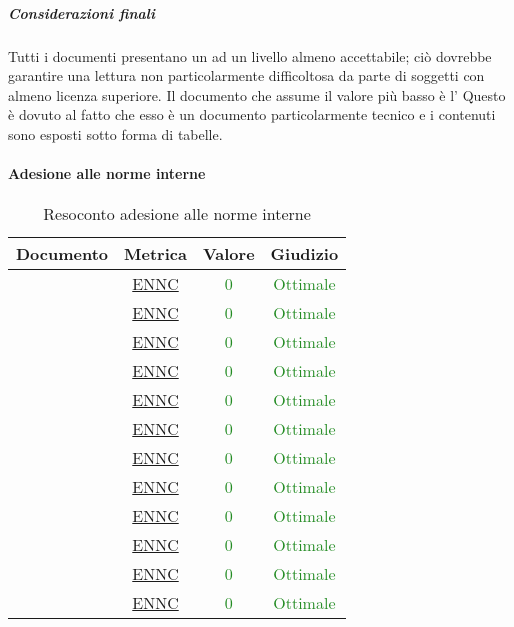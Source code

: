 					\subparagraph{Considerazioni finali}
					Tutti i documenti presentano un  ad un livello almeno accettabile; ciò dovrebbe garantire una lettura non particolarmente difficoltosa da parte di soggetti con almeno licenza superiore.
					Il documento che assume il valore più basso è l'\adrvuno{}
					 Questo è dovuto al fatto che esso è un documento particolarmente tecnico e i contenuti sono esposti sotto forma di tabelle.	
					
					\paragraph{Adesione alle norme interne}
						\begin{table}[H]
							\centering
							\small
							\begin{tabular}{c | c | c | c}
								\hline
								\textbf{Documento} & \textbf{Metrica} & \textbf{Valore} & \textbf{Giudizio} \\
								\hline
								\pdpvuno & \hyperref[MAANI]{ENNC} & \textcolor{ForestGreen}{0} & \textcolor{ForestGreen}{Ottimale} \\
								\pdqvuno & \hyperref[MAANI]{ENNC} & \textcolor{ForestGreen}{0} & \textcolor{ForestGreen}{Ottimale}\\
								\ndpvuno & \hyperref[MAANI]{ENNC} &\textcolor{ForestGreen}{0} & \textcolor{ForestGreen}{Ottimale}\\
								\sdfv & \hyperref[MAANI]{ENNC} & \textcolor{ForestGreen}{0} & \textcolor{ForestGreen}{Ottimale}\\
								\adrvuno & \hyperref[MAANI]{ENNC} & \textcolor{ForestGreen}{0} & \textcolor{ForestGreen}{Ottimale}\\
								\glvuno  & \hyperref[MAANI]{ENNC} & \textcolor{ForestGreen}{0} & \textcolor{ForestGreen}{Ottimale}\\
								\vunoi& \hyperref[MAANI]{ENNC} & \textcolor{ForestGreen}{0} & \textcolor{ForestGreen}{Ottimale}\\
								\vduei& \hyperref[MAANI]{ENNC} & \textcolor{ForestGreen}{0} & \textcolor{ForestGreen}{Ottimale}\\
								\vtrei & \hyperref[MAANI]{ENNC} & \textcolor{ForestGreen}{0} & \textcolor{ForestGreen}{Ottimale}\\
								\vquattroi & \hyperref[MAANI]{ENNC} & \textcolor{ForestGreen}{0} & \textcolor{ForestGreen}{Ottimale}\\
								\vunoe & \hyperref[MAANI]{ENNC} & \textcolor{ForestGreen}{0} & \textcolor{ForestGreen}{Ottimale}\\
								\vduee & \hyperref[MAANI]{ENNC} & \textcolor{ForestGreen}{0} & \textcolor{ForestGreen}{Ottimale}\\
								\hline
							\end{tabular}
							\caption{Resoconto adesione alle norme interne}
							\label{tab_resoconto_adesione_alle_norme_interne}
						\end{table}
					
